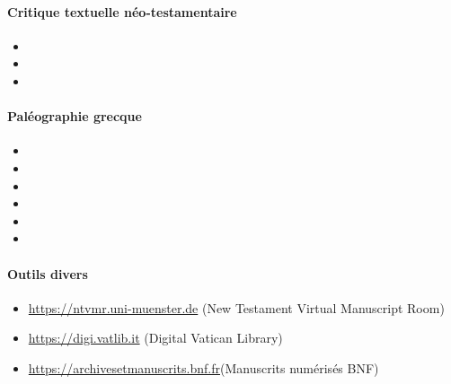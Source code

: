 \documentclass[a4, 12pt]{article}
\begin{document}
\paragraph{Critique textuelle néo-testamentaire}



\begin{itemize}
    \item {}
    \item {}
    \item {}

\end{itemize}

\paragraph{Paléographie grecque}

\begin{itemize}
    \item {}
    \item {}
    \item {}
    \item {}
    \item {}
    \item {}
\end{itemize}

\paragraph{Outils divers}
\begin{itemize}
    \item \url{https://ntvmr.uni-muenster.de} (New Testament Virtual Manuscript Room)
    \item \url{https://digi.vatlib.it} (Digital Vatican Library)
    \item \url{https://archivesetmanuscrits.bnf.fr}(Manuscrits numérisés BNF)
\end{itemize}
\end{document}
